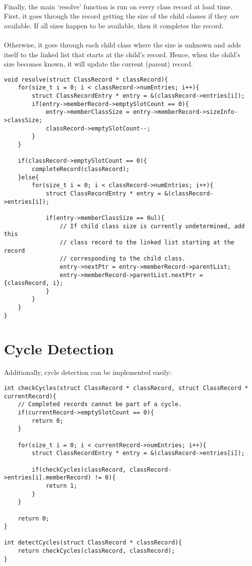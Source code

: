 \documentclass{article}
\begin{document}
\paragraph{}
Finally, the main `resolve' function is run on every class record at load time. First, it goes through the record getting the size of the child classes if they are available. If all sizes happen to be available, then it completes the record.

\paragraph{}
Otherwise, it goes through each child class where the size is unknown and adds itself to the linked list that starts at the child's record. Hence, when the child's size becomes known, it will update the current (parent) record.

\begin{lstlisting}
void resolve(struct ClassRecord * classRecord){
	for(size_t i = 0; i < classRecord->numEntries; i++){
		struct ClassRecordEntry * entry = &(classRecord->entries[i]);
		if(entry->memberRecord->emptySlotCount == 0){
			entry->memberClassSize = entry->memberRecord->sizeInfo->classSize;
			classRecord->emptySlotCount--;
		}
	}
	
	if(classRecord->emptySlotCount == 0){
		completeRecord(classRecord);
	}else{
		for(size_t i = 0; i < classRecord->numEntries; i++){
			struct ClassRecordEntry * entry = &(classRecord->entries[i]);
			
			if(entry->memberClassSize == 0ul){
				// If child class size is currently undetermined, add this
				// class record to the linked list starting at the record
				// corresponding to the child class.
				entry->nextPtr = entry->memberRecord->parentList;
				entry->memberRecord->parentList.nextPtr = {classRecord, i};
			}
		}
	}
}
\end{lstlisting}

\section{Cycle Detection}

\paragraph{}
Additionally, cycle detection can be implemented easily:

\begin{lstlisting}
int checkCycles(struct ClassRecord * classRecord, struct ClassRecord * currentRecord){
	// Completed records cannot be part of a cycle.
	if(currentRecord->emptySlotCount == 0){
		return 0;
	}

	for(size_t i = 0; i < currentRecord->numEntries; i++){
		struct ClassRecordEntry * entry = &(classRecord->entries[i]);
		
		if(checkCycles(classRecord, classRecord->entries[i].memberRecord) != 0){
			return 1;
		}
	}
	
	return 0;
}

int detectCycles(struct ClassRecord * classRecord){
	return checkCycles(classRecord, classRecord);
}
\end{lstlisting}
\end{document}
